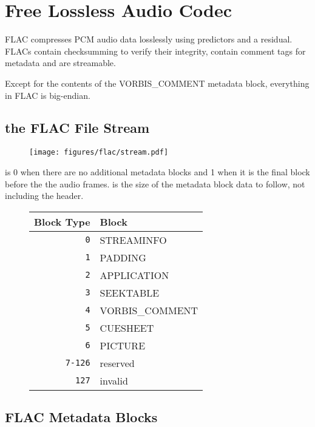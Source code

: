 
\chapter{Free Lossless Audio Codec}
FLAC compresses PCM audio data losslessly using predictors and a
residual.
FLACs contain checksumming to verify their integrity, contain comment tags for
metadata and are streamable.

Except for the contents of the VORBIS\_COMMENT metadata block, everything in FLAC is big-endian.

\section{the FLAC File Stream}
\begin{figure}[h]
\texttt{[image: figures/flac/stream.pdf]}
\end{figure}
\par
\noindent
{} is 0 when there are no additional metadata blocks and 1 when
it is the final block before the the audio frames.
 is the size of the metadata block data to follow,
not including the header.
\begin{figure}[h]
\begin{tabular}{| r | l |}
\hline
Block Type & Block \\
\hline
\texttt{0} & STREAMINFO \\
\texttt{1} & PADDING \\
\texttt{2} & APPLICATION \\
\texttt{3} & SEEKTABLE \\
\texttt{4} & VORBIS\_COMMENT \\
\texttt{5} & CUESHEET \\
\texttt{6} & PICTURE \\
\texttt{7-126} & reserved \\
\texttt{127} & invalid \\
\hline
\end{tabular}
\end{figure}

\pagebreak

\section{FLAC Metadata Blocks}

